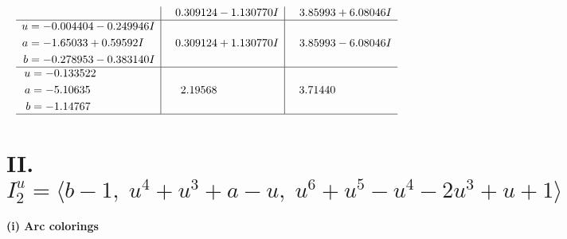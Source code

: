 \documentclass[1p]{elsarticle_modified}
\theoremstyle{definition}
\begin{document}
$$\begin{array}{c|c|c}
 & \phantom{-}0.309124 - 1.130770 I & \phantom{-}3.85993 + 6.08046 I \\ \hline\begin{aligned}
u &= -0.004404 - 0.249946 I \\
a &= -1.65033 + 0.59592 I \\
b &= -0.278953 - 0.383140 I\end{aligned}
 & \phantom{-}0.309124 + 1.130770 I & \phantom{-}3.85993 - 6.08046 I \\ \hline\begin{aligned}
u &= -0.133522\phantom{ +0.000000I} \\
a &= -5.10635\phantom{ +0.000000I} \\
b &= -1.14767\phantom{ +0.000000I}\end{aligned}
 & \phantom{-}2.19568\phantom{ +0.000000I} & \phantom{-}3.71440\phantom{ +0.000000I}\\
 \hline 
 \end{array}$$\newpage\newpage\renewcommand{\arraystretch}{1}
\centering \section*{II. $I^u_{2}= \langle b-1,\;u^4+u^3+a- u,\;u^6+u^5- u^4-2 u^3+u+1 \rangle$}
\flushleft \textbf{(i) Arc colorings}\\
\end{document}
